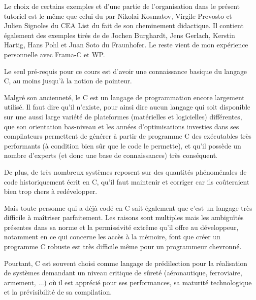 

\begin{Information}
Le choix de certains exemples et d'une partie de l'organisation dans le présent 
tutoriel est le même que celui du 
par Nikolai Kosmatov, Virgile Prevosto et Julien Signoles du CEA List du fait de
son cheminement didactique. Il contient également des exemples tirés de 
\textit{} 
de Jochen Burghardt, Jens Gerlach, Kerstin Hartig, Hans Pohl et Juan Soto du 
Fraunhofer. Le reste vient de mon expérience personnelle avec Frama-C et WP.

Le seul pré-requis pour ce cours est d'avoir une connaissance basique du 
langage C, au moins jusqu'à la notion de pointeur.
\end{Information}


Malgré son ancienneté, le C est un langage de programmation encore largement 
utilisé. Il faut dire qu'il n'existe, pour ainsi dire aucun langage qui soit 
disponible sur une aussi large variété de plateformes (matérielles et 
logicielles) différentes, que son orientation bas-niveau et les années 
d'optimisations investies dans ses compilateurs permettent de générer à 
partir de programme C des exécutables très performants (à condition bien sûr 
que le code le permette), et qu'il possède un nombre d'experts (et donc une 
base de connaissances) très conséquent.



De plus, de très nombreux systèmes reposent sur des quantités phénoménales de
code historiquement écrit en C, qu'il faut maintenir et corriger car ils 
coûteraient bien trop chers à redévelopper.



Mais toute personne qui a déjà codé en C sait également que c'est un langage 
très difficile à maîtriser parfaitement. Les raisons sont multiples mais les 
ambiguïtés présentes dans sa norme et la permissivité extrême qu'il offre au 
développeur, notamment en ce qui concerne les accès à la mémoire, font que 
créer un programme C robuste est très difficile même pour un programmeur 
chevronné.



Pourtant, C est souvent choisi comme langage de prédilection pour la 
réalisation de systèmes demandant un niveau critique de sûreté (aéronautique, 
ferroviaire, armement, ...) où il est apprécié pour ses performances, sa 
maturité technologique et la prévisibilité de sa compilation.



